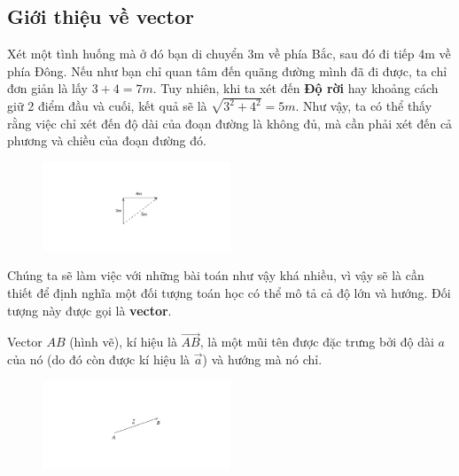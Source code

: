 \subsection{Giới thiệu về vector}
Xét một tình huống mà ở đó bạn di chuyển 3m về phía Bắc, sau đó đi tiếp 4m về phía Đông. Nếu như bạn chỉ quan tâm đến quãng đường mình đã đi được, ta chỉ đơn giản là lấy \(3+4=7\si{m}\). Tuy nhiên, khi ta xét đến \textbf{Độ rời} hay khoảng cách giữ 2 điểm đầu và cuối, kết quả sẽ là \(\sqrt{3^2+4^2}=5\si{m}\). Như vậy, ta có thể thấy rằng việc chỉ xét đến độ dài của đoạn đường là không đủ, mà cần phải xét đến cả phương và chiều của đoạn đường đó.
\begin{figure}
\centering
\includegraphics[width=0.5\textwidth]{Tuan2/Figures/gioithieuvector.png}
\end{figure}
Chúng ta sẽ làm việc với những bài toán như vậy khá nhiều, vì vậy sẽ là cần thiết để định nghĩa một đối tượng toán học có thể mô tả cả độ lớn và hướng. Đối tượng này được gọi là \textbf{vector}.
\begin{definition} Vector \(AB\) (hình vẽ), kí hiệu là \(\overrightarrow{AB}\), là một mũi tên được đặc trưng bởi độ dài \(a\) của nó (do đó còn được kí hiệu là \(\overrightarrow{a}\)) và hướng mà nó chỉ.
\end{definition}
\begin{figure}
\centering
\includegraphics[width=0.5\textwidth]{Tuan2/Figures/vectorAB.png}
\end{figure}


